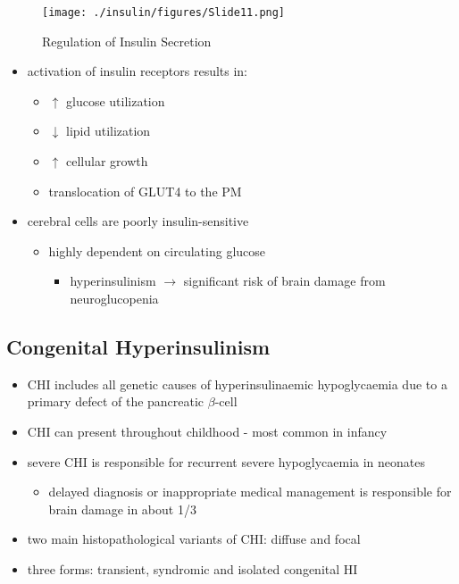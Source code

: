 \documentclass{scrartcl}
\begin{document}
\begin{figure}[htbp]
\centering
\texttt{[image: ./insulin/figures/Slide11.png]}
\caption[insulin]{\label{fig:org495d7ac}
Regulation of Insulin Secretion}
\end{figure}


\begin{itemize}
\item activation of insulin receptors results in:
\begin{itemize}
\item \(\uparrow\) glucose utilization
\item \(\downarrow\) lipid utilization
\item \(\uparrow\) cellular growth
\item translocation of GLUT4 to the PM
\end{itemize}
\item cerebral cells are poorly insulin-sensitive
\begin{itemize}
\item highly dependent on circulating glucose
\begin{itemize}
\item hyperinsulinism \(\to\) significant risk of brain damage from
neuroglucopenia
\end{itemize}
\end{itemize}
\end{itemize}

\subsection{Congenital Hyperinsulinism}
\label{sec:org18141b6}
\begin{itemize}
\item CHI includes all genetic causes of hyperinsulinaemic
hypoglycaemia due to a primary defect of the pancreatic
\(\beta\)-cell
\item CHI can present throughout childhood - most common in infancy
\item severe CHI is responsible for recurrent severe hypoglycaemia in neonates
\begin{itemize}
\item delayed diagnosis or inappropriate medical management is responsible for brain damage in about 1/3
\end{itemize}
\item two main histopathological variants of CHI: diffuse and focal
\item three forms: transient, syndromic and isolated congenital HI
\end{itemize}
\end{document}

